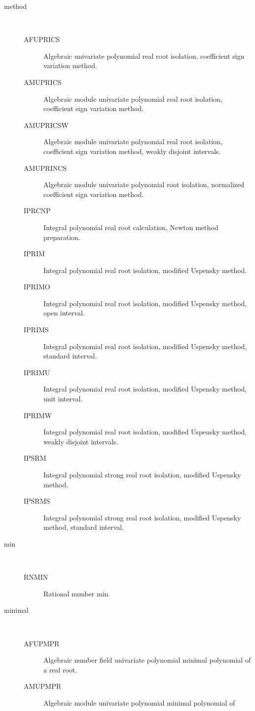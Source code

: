 \begin{description}
\begin{description}
  \end{description}
\item[method] \ \ 
  \begin{description}
  \item[AFUPRICS]  Algebraic univariate polynomial real root isolation,
    coefficient sign variation method.
  \item[AMUPRICS]  Algebraic module univariate polynomial real root isolation,
    coefficient sign variation method.
  \item[AMUPRICSW]  Algebraic module univariate polynomial real root
    isolation, coefficient sign variation method, weakly disjoint intervals.
  \item[AMUPRINCS]  Algebraic module univariate polynomial root isolation,
    normalized coefficient sign variation method.
  \item[IPRCNP]  Integral polynomial real root calculation, Newton method
    preparation.
  \item[IPRIM]  Integral polynomial real root isolation, modified Uspensky
    method.
  \item[IPRIMO]  Integral polynomial real root isolation, modified Uspensky
    method, open interval.
  \item[IPRIMS]  Integral polynomial real root isolation, modified Uspensky
    method, standard interval.
  \item[IPRIMU]  Integral polynomial real root isolation, modified Uspensky
    method, unit interval.
  \item[IPRIMW]  Integral polynomial real root isolation, modified Uspensky
    method, weakly disjoint intervals.
  \item[IPSRM]  Integral polynomial strong real root isolation, modified
    Uspensky method.
  \item[IPSRMS]  Integral polynomial strong real root isolation, modified
    Uspensky method, standard interval.
  \end{description}
\item[min] \ \ 
  \begin{description}
  \item[RNMIN]  Rational number min.
  \end{description}
\item[minimal] \ \ 
  \begin{description}
  \item[AFUPMPR]  Algebraic number field univariate polynomial minimal
    polynomial of a real root.
  \item[AMUPMPR]  Algebraic module univariate polynomial minimal polynomial of

\end{description}
\end{description}
